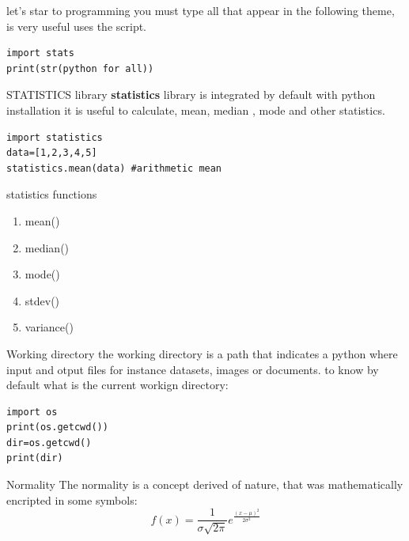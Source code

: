 \documentclass{beamer}
\begin{document}
\begin{frame}[fragile]{let's star to programming}
you must type all that appear in the following theme, is very useful uses the script.
\begin{lstlisting}
import stats 
print(str(python for all))
\end{lstlisting}
\end{frame}



\begin{frame}[fragile]{STATISTICS library}
\textbf{statistics} library is integrated by default with  python installation it is useful to calculate, mean, median , mode and other statistics.
\begin{lstlisting}
import statistics
data=[1,2,3,4,5]
statistics.mean(data) #arithmetic mean
\end{lstlisting}
\end{frame}



\begin{frame}{statistics functions}
\begin{enumerate}
\item mean()
\item median()
\item mode()
\item stdev()
\item variance()
\end{enumerate}
\end{frame}


\begin{frame}[fragile]{Working directory}
the working directory is a path that indicates a python where input and otput files
for instance datasets, images or documents.  to know by default what is the current workign directory:
\begin{lstlisting}[fragile]
import os
print(os.getcwd())
dir=os.getcwd()
print(dir)
\end{lstlisting}
\end{frame}


\begin{frame}{Normality}
The normality is a concept derived of nature, that was mathematically encripted in some symbols:
\begin{equation}
f(x)= \frac{1}{\sigma \sqrt{2 \pi}}  e^{\frac{(x - \mu)^{2} }{ 2 \sigma^{2}}}
\end{equation}
\end{frame}
\end{document}
